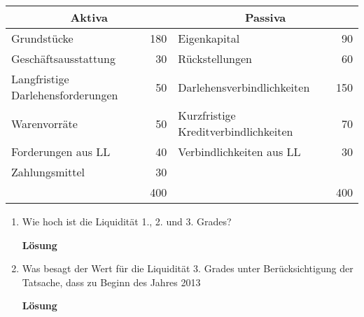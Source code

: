 \documentclass[12pt,a4paper]{scrreprt}
\newcommand{\Lsg}{\textbf{Lösung}\nobreak}
\begin{document}
\begin{enumerate}
\begin{tabular}{|lr|lr|}
\hline \multicolumn{2}{|c|}{Aktiva} & \multicolumn{2}{|c|}{Passiva} \\\hline
Grundstücke & 180 & Eigenkapital & 90 \\\hline
Geschäftsausstattung & 30 & Rückstellungen & 60 \\\hline
Langfristige Darlehensforderungen & 50 & Darlehensverbindlichkeiten & 150 \\\hline
Warenvorräte & 50 & Kurzfristige Kreditverbindlichkeiten & 70 \\\hline
Forderungen aus LL & 40 & Verbindlichkeiten aus LL & 30 \\\hline
Zahlungsmittel & 30 &  \multicolumn{2}{|l|}{} \\\hline
 \multicolumn{2}{|r|}{400} & \multicolumn{2}{|r|}{400} \\\hline
\end{tabular}

\begin{enumerate}
\item Wie hoch ist die Liquidität 1., 2. und 3. Grades?

\Lsg

\begin{comment}
L1
30/100
30\%

L2
70\%

L3
120\%
\end{comment}

\item Was besagt der Wert für die Liquidität 3. Grades unter Berücksichtigung der Tatsache, dass zu Beginn des Jahres 2013


\Lsg



\end{enumerate}


\end{enumerate}
\end{document}
